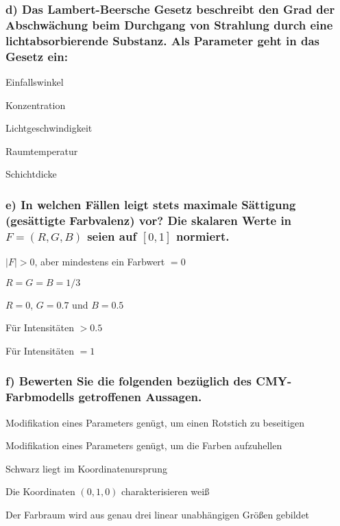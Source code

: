 \documentclass[10pt, a4paper]{article}
\begin{document}
\subsubsection{d) Das Lambert-Beersche Gesetz beschreibt den Grad der Abschwächung beim Durchgang von Strahlung durch eine lichtabsorbierende Substanz. Als Parameter geht in das Gesetz ein:}
\begin{multicols}{3}
    \begin{todolist}
        \item Einfallswinkel
        \item Konzentration
        \item Lichtgeschwindigkeit
        \item Raumtemperatur
        \item Schichtdicke
    \end{todolist}
\end{multicols}

\subsubsection{e) In welchen Fällen leigt stets maximale Sättigung (gesättigte Farbvalenz) vor? Die skalaren Werte in $F=(R,G,B)$ seien auf $[0,1]$ normiert.}
\begin{multicols}{3}
    \begin{todolist}
        \item $|F|>0$, aber mindestens ein Farbwert $=0$
        \item $R=G=B=1/3$
        \item $R=0$, $G=0.7$ und $B=0.5$
        \item Für Intensitäten $>0.5$
        \item Für Intensitäten $=1$
    \end{todolist}
\end{multicols}

\subsubsection{f) Bewerten Sie die folgenden bezüglich des CMY-Farbmodells getroffenen Aussagen.}
\begin{multicols}{3}
    \begin{todolist}
        \item Modifikation eines Parameters genügt, um einen Rotstich zu beseitigen
        \item Modifikation eines Parameters genügt, um die Farben aufzuhellen
        \item Schwarz liegt im Koordinatenursprung
        \item Die Koordinaten $(0,1,0)$ charakterisieren weiß
        \item Der Farbraum wird aus genau drei linear unabhängigen Größen gebildet
    \end{todolist}
\end{multicols}
\end{document}
